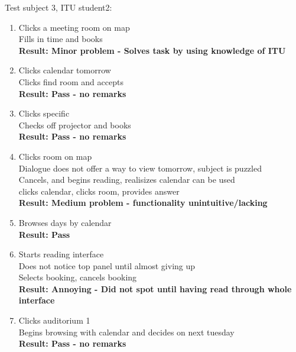 Test subject 3, ITU student2:
\begin{enumerate}
\item Clicks a meeting room on map \\
Fills in time and books\\
\textbf{Result: Minor problem - Solves task by using knowledge of ITU}
\item Clicks calendar tomorrow \\
Clicks find room and accepts \\
\textbf{Result: Pass - no remarks}
\item Clicks specific \\
Checks off projector and books \\
\textbf{Result: Pass - no remarks}
\item Clicks room on map \\
Dialogue does not offer a way to view tomorrow, subject is puzzled \\
Cancels, and begins reading, realisizes calendar can be used \\
clicks calendar, clicks room, provides answer \\
\textbf{Result: Medium problem - functionality unintuitive/lacking}
\item Browses days by calendar \\
\textbf{Result: Pass}
\item Starts reading interface \\
Does not notice top panel until almost giving up \\
Selects booking, cancels booking \\
\textbf{Result: Annoying - Did not spot until having read through whole interface}
\item Clicks auditorium 1 \\
Begins browsing with calendar and decides on next tuesday \\
\textbf{Result: Pass - no remarks}
\end{enumerate}

